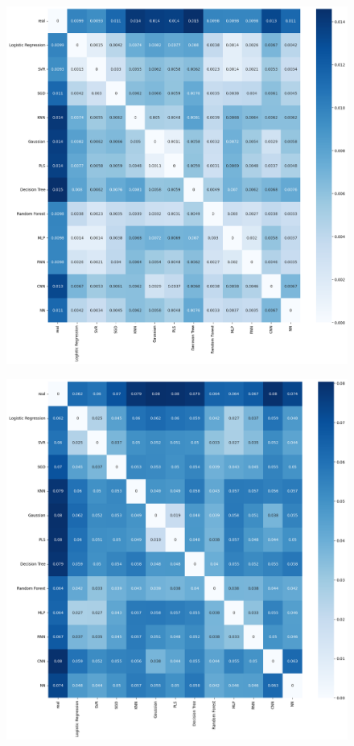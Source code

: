 \begin{figure}[H]
    \centering
    \includegraphics[width=\textwidth]{images/mse_matrix.png}
    \caption{}
    \label{mse-matrix}
\end{figure}

\begin{figure}[H]
    \centering
    \includegraphics[width=\textwidth]{images/mae_matrix.png}
    \caption{}
    \label{mae-matrix}
\end{figure}



